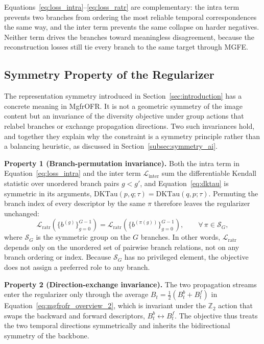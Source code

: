 Equations~\eqref{eq:loss_intra}--\eqref{eq:loss_ratr} are complementary: the intra term prevents two branches from ordering the most reliable temporal correspondences the same way, and the inter term prevents the same collapse on harder negatives. Neither term drives the branches toward meaningless disagreement, because the reconstruction losses still tie every branch to the same target through MGFE.

\subsection{Symmetry Property of the Regularizer}
\label{subsec:symmetry_property}

The representation symmetry introduced in Section~\ref{sec:introduction} has a concrete meaning in MgfrOFR. It is not a geometric symmetry of the image content but an invariance of the diversity objective under group actions that relabel branches or exchange propagation directions. Two such invariances hold, and together they explain why the constraint is a symmetry principle rather than a balancing heuristic, as discussed in Section~\ref{subsec:symmetry_ai}.

\textbf{Property 1 (Branch-permutation invariance).} Both the intra term in Equation~\eqref{eq:loss_intra} and the inter term $\mathcal{L}_{\text{inter}}$ sum the differentiable Kendall statistic over unordered branch pairs $g<g'$, and Equation~\eqref{eq:dktau} is symmetric in its arguments, $\mathrm{DKTau}(p,q;\tau)=\mathrm{DKTau}(q,p;\tau)$. Permuting the branch index of every descriptor by the same $\pi$ therefore leaves the regularizer unchanged:
\begin{equation}
\mathcal{L}_{\text{ratr}}\!\left(\{b^{(g)}\}_{g=0}^{G-1}\right)
=
\mathcal{L}_{\text{ratr}}\!\left(\{b^{(\pi(g))}\}_{g=0}^{G-1}\right),
\qquad
\forall\,\pi\in\mathcal{S}_G,
\label{eq:branch_permutation}
\end{equation}
where $\mathcal{S}_G$ is the symmetric group on the $G$ branches. In other words, $\mathcal{L}_{\text{ratr}}$ depends only on the unordered set of pairwise branch relations, not on any branch ordering or index. Because $\mathcal{S}_G$ has no privileged element, the objective does not assign a preferred role to any branch.

\textbf{Property 2 (Direction-exchange invariance).} The two propagation streams enter the regularizer only through the average $B_t=\tfrac{1}{2}(B_t^{b}+B_t^{f})$ in Equation~\eqref{eq:mgfrofr_overview_2}, which is invariant under the $\mathbb{Z}_2$ action that swaps the backward and forward descriptors, $B_t^{b}\!\leftrightarrow\!B_t^{f}$. The objective thus treats the two temporal directions symmetrically and inherits the bidirectional symmetry of the backbone.

